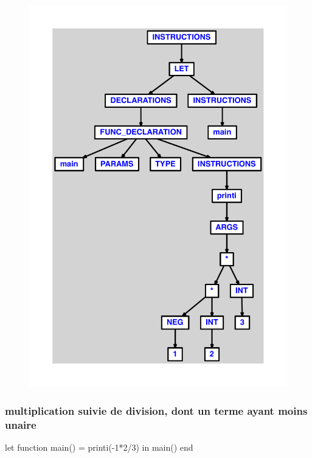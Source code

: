 \documentclass{article}
\begin{document}
\begin{figure}[H]\centering\includegraphics[max width=\textwidth]{ast/ast_73.pdf}\end{figure}\subsubsection{multiplication suivie de division, dont un terme ayant moins unaire}
\begin{verbatimtab}
let
	function main() = printi(-1*2/3)
in main() end
\end{verbatimtab}
\end{document}
